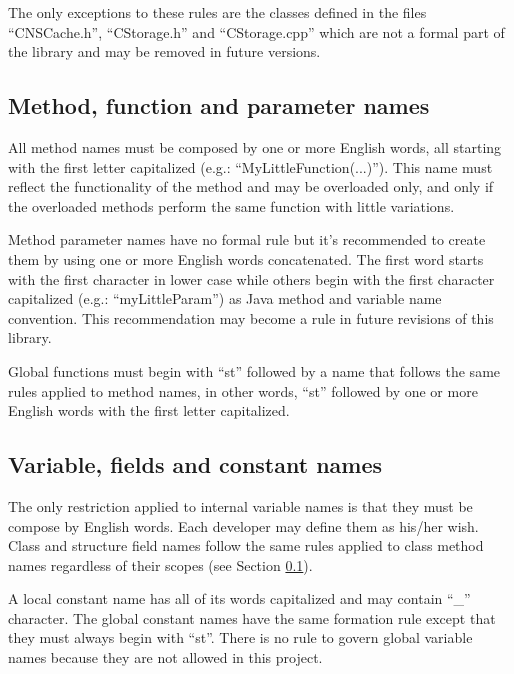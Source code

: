 The only exceptions to these rules are the classes defined in the files ``CNSCache.h'', ``CStorage.h'' and ``CStorage.cpp'' which are not a formal part of the library and may be removed in future versions.

\subsection{Method, function and parameter names}
\label{sec:coding.methodnames}

All method names must be composed by one or more English words, all starting with the first letter capitalized (e.g.: ``MyLittleFunction(...)''). This name must reflect the functionality of the method and may be overloaded only, and only if the overloaded methods perform the same function with little variations.

Method parameter names have no formal rule but it's recommended to create them by using one or more English words concatenated. The first word starts with the first character in lower case while others begin with the first character capitalized (e.g.: ``myLittleParam'') as Java method and variable name convention. This recommendation may become a rule in future revisions of this library.

Global functions must begin with ``st'' followed by a name that follows the same rules applied to method names, in other words, ``st'' followed by one or more English words with the first letter capitalized.

\subsection{Variable, fields and constant names}
\label{sec:coding.varnames}

The only restriction applied to internal variable names is that they must be compose by English words. Each developer may define them as his/her wish. Class and structure field names follow the same rules applied to class method names regardless of their scopes (see Section \ref{sec:coding.methodnames}).

A local constant name has all of its words capitalized and may contain ``\_'' character. The global constant names have the same formation rule except that they must always begin with ``st''. There is no rule to govern global variable names because they are not allowed in this project.

